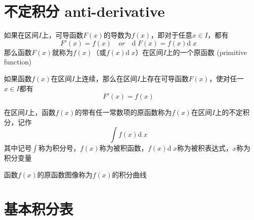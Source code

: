 \documentclass[UTF8]{ctexart}
\newcommand{\D}{\text{d}\;\!}
\begin{document}
\section*{不定积分 anti-derivative}

\bigskip

如果在区间$I$上，可导函数$F(x)$的导数为$f(x)$，即对于任意$x\in I$，都有
\[ F'(x)=f(x)\quad or \quad \D F(x)=f(x)\D x \]
那么函数$F(x)$就称为$f(x)$（或$f(x)\D x$）在区间$I$上的一个原函数 (primitive function)

\bigskip

如果函数$f(x)$在区间$I$上连续，那么在区间$I$上存在可导函数$F(x)$，使对任一$x\in I$都有
\[ F'(x)=f(x) \]

\bigskip

在区间$I$上，函数$f(x)$的带有任一常数项的原函数称为$f(x)$在区间$I$上的不定积分，记作
\[\int f(x)\D x\]
其中记号$\displaystyle\int$称为积分号，$f(x)$称为被积函数，$f(x)\D x$称为被积表达式，$x$称为积分变量

函数$f(x)$的原函数图像称为$f(x)$的积分曲线
\bigskip
\bigskip

\section*{基本积分表}

\bigskip
\end{document}
